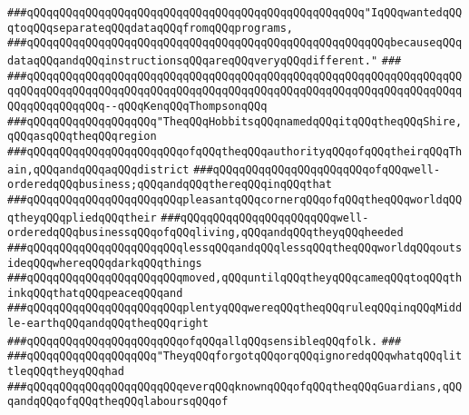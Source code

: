 \newline
\newline
\newline
\newline
\verb|###qQQqqQQqqQQqqQQqqQQqqQQqqQQqqQQqqQQqqQQqqQQqqQQqqQQq"IqQQqwantedqQQqtoqQQqseparateqQQqdataqQQqfromqQQqprograms,|\newline
\verb|###qQQqqQQqqQQqqQQqqQQqqQQqqQQqqQQqqQQqqQQqqQQqqQQqqQQqqQQqbecauseqQQqdataqQQqandqQQqinstructionsqQQqareqQQqveryqQQqdifferent."|\newline
\verb|###|\newline
\verb|###qQQqqQQqqQQqqQQqqQQqqQQqqQQqqQQqqQQqqQQqqQQqqQQqqQQqqQQqqQQqqQQqqQQqqQQqqQQqqQQqqQQqqQQqqQQqqQQqqQQqqQQqqQQqqQQqqQQqqQQqqQQqqQQqqQQqqQQqqQQqqQQqqQQqqQQq--qQQqKenqQQqThompsonqQQq|\newline
\newline
\newline
\newline
\verb|###qQQqqQQqqQQqqQQqqQQq"TheqQQqHobbitsqQQqnamedqQQqitqQQqtheqQQqShire,qQQqasqQQqtheqQQqregion|\newline
\verb|###qQQqqQQqqQQqqQQqqQQqqQQqofqQQqtheqQQqauthorityqQQqofqQQqtheirqQQqThain,qQQqandqQQqaqQQqdistrict|\newline
\verb|###qQQqqQQqqQQqqQQqqQQqqQQqofqQQqwell-orderedqQQqbusiness;qQQqandqQQqthereqQQqinqQQqthat|\newline
\verb|###qQQqqQQqqQQqqQQqqQQqqQQqpleasantqQQqcornerqQQqofqQQqtheqQQqworldqQQqtheyqQQqpliedqQQqtheir|\newline
\verb|###qQQqqQQqqQQqqQQqqQQqqQQqwell-orderedqQQqbusinessqQQqofqQQqliving,qQQqandqQQqtheyqQQqheeded|\newline
\verb|###qQQqqQQqqQQqqQQqqQQqqQQqlessqQQqandqQQqlessqQQqtheqQQqworldqQQqoutsideqQQqwhereqQQqdarkqQQqthings|\newline
\verb|###qQQqqQQqqQQqqQQqqQQqqQQqmoved,qQQquntilqQQqtheyqQQqcameqQQqtoqQQqthinkqQQqthatqQQqpeaceqQQqand|\newline
\verb|###qQQqqQQqqQQqqQQqqQQqqQQqplentyqQQqwereqQQqtheqQQqruleqQQqinqQQqMiddle-earthqQQqandqQQqtheqQQqright|\newline
\verb|###qQQqqQQqqQQqqQQqqQQqqQQqofqQQqallqQQqsensibleqQQqfolk.|\newline
\verb|###|\newline
\verb|###qQQqqQQqqQQqqQQqqQQq"TheyqQQqforgotqQQqorqQQqignoredqQQqwhatqQQqlittleqQQqtheyqQQqhad|\newline
\verb|###qQQqqQQqqQQqqQQqqQQqqQQqeverqQQqknownqQQqofqQQqtheqQQqGuardians,qQQqandqQQqofqQQqtheqQQqlaboursqQQqof|\newline
